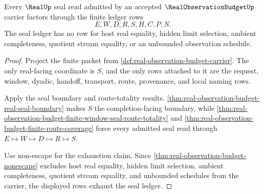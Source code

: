 \begin{theorem}
\label{thm:real-observation-budget-seal-ledger-exhaustion}
Every $\RealUp$ seal read admitted by an accepted $\RealObservationBudgetUp$ carrier factors through the finite ledger rows
$$
E,W,D,R,S,H,C,P,N.
$$
The seal ledger has no row for host real equality, hidden limit selection, ambient completeness, quotient stream equality, or an unbounded observation schedule.
\end{theorem}
\begin{proof}
Project the finite packet from \autoref{def:real-observation-budget-carrier}. The only real-facing coordinate is $S$, and the only rows attached to it are the request, window, dyadic, handoff, transport, route, provenance, and local naming rows.

Apply the seal boundary and route-totality results. \autoref{thm:real-observation-budget-real-seal-boundary} makes $S$ the completion-facing boundary, while \autoref{thm:real-observation-budget-finite-window-seal-route-totality} and \autoref{thm:real-observation-budget-finite-route-coverage} force every admitted seal read through $E \longmapsto W \longmapsto D \longmapsto R \longmapsto S$.

Use non-escape for the exhaustion claim. Since \autoref{thm:real-observation-budget-nonescape} excludes host real equality, hidden limit selection, ambient completeness, quotient stream equality, and unbounded schedules from the carrier, the displayed rows exhaust the seal ledger.
\end{proof}

